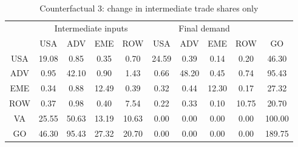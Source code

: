 \begin{table}[p]
\begin{center}
\caption{Counterfactual 3: change in intermediate trade shares only}
\label{tab:iomat-io-counter}
\small
\begin{tabular}{cccccccccc}
\toprule
& \multicolumn{4}{c}{Intermediate inputs}& \multicolumn{4}{c}{Final demand} & \\
\cmidrule(rl){2-5}\cmidrule(rl){6-9}
 &USA &ADV &EME &ROW &USA &ADV &EME &ROW& GO\\
\midrule
USA& 19.08& 0.85& 0.35& 0.70& 24.59& 0.39& 0.14& 0.20& 46.30 \\
ADV& 0.95& 42.10& 0.90& 1.43& 0.66& 48.20& 0.45& 0.74& 95.43 \\
EME& 0.34& 0.88& 12.49& 0.39& 0.32& 0.44& 12.30& 0.17& 27.32 \\
ROW& 0.37& 0.98& 0.40& 7.54& 0.22& 0.33& 0.10& 10.75& 20.70 \\
\midrule
VA& 25.55& 50.63& 13.19& 10.63& 0.00& 0.00& 0.00& 0.00& 100.00\\
\midrule
GO& 46.30& 95.43& 27.32& 20.70& 0.00& 0.00& 0.00& 0.00& 189.75\\
\bottomrule
\end{tabular}
\normalsize
\end{center}
\end{table}

